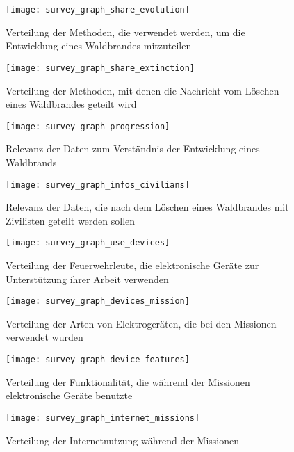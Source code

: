 \begin{figure}[H]
  \centering
  \texttt{[image: survey\_graph\_share\_evolution]}
  \caption{Verteilung der Methoden, die verwendet werden, um die Entwicklung eines Waldbrandes mitzuteilen}
  \label{fig:survey_graph_share_evolution}
\end{figure}

\begin{figure}[H]
  \centering
  \texttt{[image: survey\_graph\_share\_extinction]}
  \caption{Verteilung der Methoden, mit denen die Nachricht vom Löschen eines Waldbrandes geteilt wird}
  \label{fig:survey_graph_share_extinction}
\end{figure}

\begin{figure}[H]
  \centering
  \texttt{[image: survey\_graph\_progression]}
  \caption{Relevanz der Daten zum Verständnis der Entwicklung eines Waldbrands}
  \label{fig:survey_graph_progression}
\end{figure}

\begin{figure}[H]
  \centering
  \texttt{[image: survey\_graph\_infos\_civilians]}
  \caption{Relevanz der Daten, die nach dem Löschen eines Waldbrandes mit Zivilisten geteilt werden sollen}
  \label{fig:survey_graph_infos_civilians}
\end{figure}

\begin{figure}[H]
  \centering
  \texttt{[image: survey\_graph\_use\_devices]}
  \caption{Verteilung der Feuerwehrleute, die elektronische Geräte zur Unterstützung ihrer Arbeit verwenden}
  \label{fig:survey_graph_use_devices}
\end{figure}

\begin{figure}[H]
  \centering
  \texttt{[image: survey\_graph\_devices\_mission]}
  \caption{Verteilung der Arten von Elektrogeräten, die bei den Missionen verwendet wurden}
  \label{fig:survey_graph_devices_mission}
\end{figure}

\begin{figure}[H]
  \centering
  \texttt{[image: survey\_graph\_device\_features]}
  \caption{Verteilung der Funktionalität, die während der Missionen elektronische Geräte benutzte}
  \label{fig:survey_graph_device_features}
\end{figure}

\begin{figure}[H]
  \centering
  \texttt{[image: survey\_graph\_internet\_missions]}
  \caption{Verteilung der Internetnutzung während der Missionen}
  \label{fig:survey_graph_internet_missions}
\end{figure}

